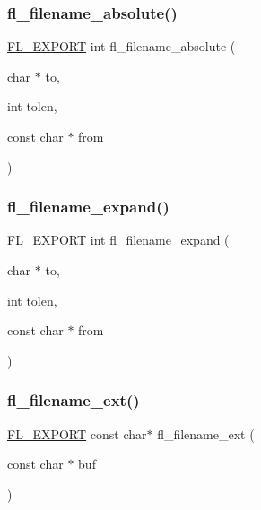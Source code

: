 \subsubsection{\texorpdfstring{fl\+\_\+filename\+\_\+absolute()}{fl\_filename\_absolute()}}
{\footnotesize\ttfamily \hyperlink{_fl___export_8_h_aa9ba29a18aee9d738370a06eeb4470fc}{F\+L\+\_\+\+E\+X\+P\+O\+RT} int fl\+\_\+filename\+\_\+absolute (\begin{DoxyParamCaption}\item[{char $\ast$}]{to,  }\item[{int}]{tolen,  }\item[{const char $\ast$}]{from }\end{DoxyParamCaption})}

\mbox{\label{group__filenames_gabf6091d3cad1ec774ba8d2608994be6c}} 
\subsubsection{\texorpdfstring{fl\+\_\+filename\+\_\+expand()}{fl\_filename\_expand()}}
{\footnotesize\ttfamily \hyperlink{_fl___export_8_h_aa9ba29a18aee9d738370a06eeb4470fc}{F\+L\+\_\+\+E\+X\+P\+O\+RT} int fl\+\_\+filename\+\_\+expand (\begin{DoxyParamCaption}\item[{char $\ast$}]{to,  }\item[{int}]{tolen,  }\item[{const char $\ast$}]{from }\end{DoxyParamCaption})}

\mbox{\label{group__filenames_gaccd45892153d060516a1571335e60a2a}} 
\subsubsection{\texorpdfstring{fl\+\_\+filename\+\_\+ext()}{fl\_filename\_ext()}}
{\footnotesize\ttfamily \hyperlink{_fl___export_8_h_aa9ba29a18aee9d738370a06eeb4470fc}{F\+L\+\_\+\+E\+X\+P\+O\+RT} const char$\ast$ fl\+\_\+filename\+\_\+ext (\begin{DoxyParamCaption}\item[{const char $\ast$}]{buf }\end{DoxyParamCaption})}

